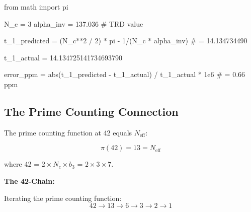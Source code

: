 \documentclass[
  11pt,
  letterpaper,
  twoside,
  openany]{book}
\makeatletter
\newenvironment{Shaded}{\begin{snugshade}}{\end{snugshade}}
\newcommand{\BuiltInTok}[1]{\textcolor[rgb]{0.00,0.23,0.31}{#1}}
\newcommand{\CommentTok}[1]{\textcolor[rgb]{0.37,0.37,0.37}{#1}}
\newcommand{\DecValTok}[1]{\textcolor[rgb]{0.68,0.00,0.00}{#1}}
\newcommand{\FloatTok}[1]{\textcolor[rgb]{0.68,0.00,0.00}{#1}}
\newcommand{\ImportTok}[1]{\textcolor[rgb]{0.00,0.46,0.62}{#1}}
\newcommand{\NormalTok}[1]{\textcolor[rgb]{0.00,0.23,0.31}{#1}}
\newcommand{\OperatorTok}[1]{\textcolor[rgb]{0.37,0.37,0.37}{#1}}
\let\orig@subsection\subsection
\renewcommand{\subsection}{\needspace{6\baselineskip}\orig@subsection}
\makeatother
\begin{document}
\begin{tcolorbox}[enhanced jigsaw, colbacktitle=quarto-callout-note-color!10!white, titlerule=0mm, bottomtitle=1mm, bottomrule=.15mm, colback=white, arc=.35mm, breakable, toprule=.15mm, title=\textcolor{quarto-callout-note-color}{\faInfo}\hspace{0.5em}{Python Verification}, rightrule=.15mm, coltitle=black, leftrule=.75mm, colframe=quarto-callout-note-color-frame, toptitle=1mm, opacityback=0, opacitybacktitle=0.6, left=2mm]

\begin{Shaded}
\begin{Highlighting}[]
\ImportTok{from}\NormalTok{ math }\ImportTok{import}\NormalTok{ pi}

\NormalTok{N\_c }\OperatorTok{=} \DecValTok{3}
\NormalTok{alpha\_inv }\OperatorTok{=} \FloatTok{137.036}  \CommentTok{\# TRD value}

\NormalTok{t\_1\_predicted }\OperatorTok{=}\NormalTok{ (N\_c}\OperatorTok{**}\DecValTok{2} \OperatorTok{/} \DecValTok{2}\NormalTok{) }\OperatorTok{*}\NormalTok{ pi }\OperatorTok{{-}} \DecValTok{1}\OperatorTok{/}\NormalTok{(N\_c }\OperatorTok{*}\NormalTok{ alpha\_inv)}
\CommentTok{\# = 14.134734490}

\NormalTok{t\_1\_actual }\OperatorTok{=} \FloatTok{14.134725141734693790}

\NormalTok{error\_ppm }\OperatorTok{=} \BuiltInTok{abs}\NormalTok{(t\_1\_predicted }\OperatorTok{{-}}\NormalTok{ t\_1\_actual) }\OperatorTok{/}\NormalTok{ t\_1\_actual }\OperatorTok{*} \FloatTok{1e6}
\CommentTok{\# = 0.66 ppm}
\end{Highlighting}
\end{Shaded}

\end{tcolorbox}

\subsection{The Prime Counting
Connection}\label{the-prime-counting-connection}

The prime counting function at 42 equals \(N_{\text{eff}}\):

\[\pi(42) = 13 = N_{\text{eff}}\]

where 42 = \(2 \times N_c \times b_3\) = \(2 \times 3 \times 7\).

\textbf{The 42-Chain:}

Iterating the prime counting function:
\[42 \to 13 \to 6 \to 3 \to 2 \to 1\]
\end{document}
